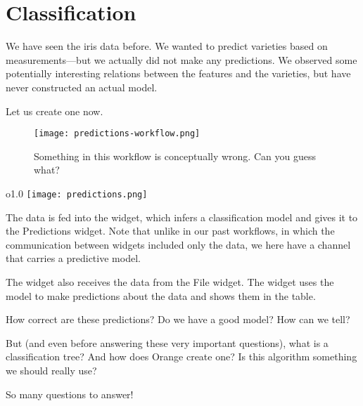 \chapter{Classification}
\label{ch:classification}

We have seen the iris data before. We wanted to predict varieties based on measurements---but we actually did not make any predictions. We observed some potentially interesting relations between the features and the varieties, but have never constructed an actual model.

Let us create one now.

\begin{figure}[h]
    \centering
    \vspace{-0.2cm}
    \texttt{[image: predictions-workflow.png]}
    \caption{Something in this workflow is conceptually wrong. Can you guess what?}
    \label{fig:spectral_preprocessing-fig2}
\end{figure}

\begin{wrapfigure}{o}{1.0\textwidth}
    \texttt{[image: predictions.png]}
    \label{fig:classification-predictions}
\end{wrapfigure}

The data is fed into the  widget, which infers a classification model and gives it to the Predictions widget. Note that unlike in our past workflows, in which the communication between widgets included only the data, we here have a channel that carries a predictive model.

The  widget also receives the data from the File widget. The widget uses the model to make predictions about the data and shows them in the table.

How correct are these predictions? Do we have a good model? How can we tell?

But (and even before answering these very important questions), what is a classification tree? And how does Orange create one? Is this algorithm something we should really use?

So many questions to answer!
